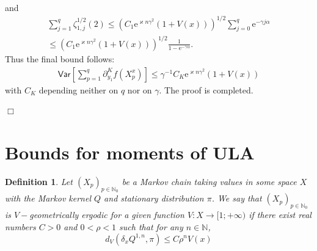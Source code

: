 \documentclass[bj]{imsart}
\def\nset{\mathbb{N}}
\def\rme{\mathrm{e}}
\newcommand{\proofendsign}{$\Box$}
\newtheorem{definition}{Definition}
\newenvironment{proof}{{\noindent \bf Proof }}
 {{\hspace*{\fill}\proofendsign\par\bigskip}}
\begin{document}
\begin{proof}
\begin{align*}
\end{align*}
and
\begin{align*}
\sum_{j=1}^{q} \zeta^{1/2}_{1,j}(2) \leq (C_1 \rme^{\varkappa n\gamma^2}(1+V(x)))^{1/2}\sum_{j=0}^{q} \rme^{-\gamma j\alpha}
\\
\leq  (C_1 \rme^{\varkappa n\gamma^2}(1+V(x)))^{1/2}\frac{ 1}{1- \rme^{- \gamma\alpha}}.
\end{align*}
Thus the final bound follows:
\begin{align*}
\mathsf{Var}\left[\sum_{p=1}^{q}\partial_{y_{1}}^{K}f\left(X^x_{p}\right)\right] \leq \gamma^{-1} C_K \rme^{\varkappa n\gamma^2} (1+V(x))
\end{align*}
 with $C_K$  depending neither on $q$ nor on $\gamma$. The proof is completed.
\end{proof}


\appendix
\section{Bounds for moments of  ULA}\label{sec:appendix}


\begin{definition}
\label{def:v_ergodicity}
Let $(X_p)_{p \in \nset_0}$ be a Markov chain taking values in some space $X$ with the Markov kernel $Q$ and stationary distribution $\pi$. We say that $(X_p)_{p \in \nset_0}$ is $V-$geometrically ergodic for a given function $V: X \rightarrow [1; +\infty)$ if there exist real numbers $C > 0$ and $0 < \rho < 1$ such that for any $n \in \nset$,
\begin{equation}
\label{eq:v_ergodicity}
d_V(\delta_xQ^{1,n},\pi) \leq C\rho^n V(x)
\end{equation}
\end{definition}
\end{document}
